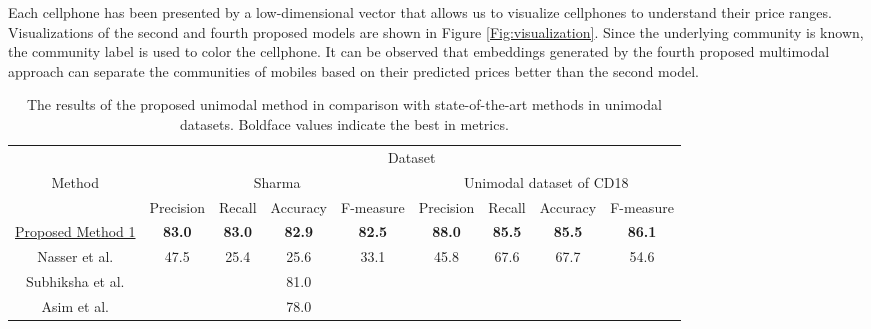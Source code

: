 \documentclass{svjour3}                     \smartqed  \usepackage{graphicx}
\begin{document}
Each cellphone has been presented by a low-dimensional vector that allows us to visualize cellphones
to understand their price ranges. Visualizations of the second and fourth proposed models are shown in Figure \ref{Fig:visualization}. Since the underlying community is known, the community label is used to color the cellphone. It can be observed that embeddings generated by the fourth proposed multimodal approach can separate the communities of mobiles based on their predicted prices better than the second model.


\begin{table}[]
    \centering
    \caption{The results of the proposed unimodal method in comparison with state-of-the-art methods in unimodal datasets. Boldface values indicate the best in metrics.}
    \label{tbl:unimodal_evaluation}
    \begin{tabular}{c|cccc|cccc}
        &\multicolumn{8}{c}{Dataset}    \\
        \cline{2-9}
        \multirow{2}{*}{Method} &\multicolumn{4}{c|}{Sharma \cite{Sharma}}   &\multicolumn{4}{c}{Unimodal dataset of CD18}   \\
        &Precision  &Recall  &Accuracy  &F-measure  &Precision  &Recall &Accuracy   &F-measure  \\
        \hline
        \hyperref[Subsec:model_1]{Proposed Method 1} &\textbf{83.0}   &\textbf{83.0}   &\textbf{82.9}   &\textbf{82.5}   &\textbf{88.0}  &\textbf{85.5}   &\textbf{85.5}  &\textbf{86.1}   \\
Nasser et al. \cite{Nasser2019} &47.5   &25.4   &25.6   &33.1   &45.8   &67.6   &67.7   &54.6   \\
        Subhiksha et al. \cite{Subhiksha2020}   &   &   &81.0   &   &   &   &   &   \\
        Asim et al. \cite{Asim2018} &   &   &78.0 &   &   &   &   & \\
        \hline
    \end{tabular}
\end{table}
\end{document}
